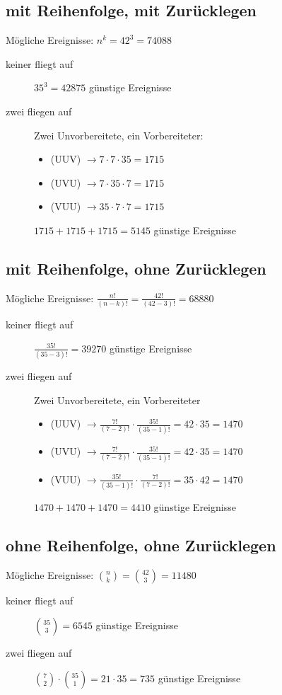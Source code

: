 \documentclass[11pt, a4paper]{article}
\begin{document}
\subsection{mit Reihenfolge, mit Zurücklegen}
Mögliche Ereignisse: $n^k = 42^3 = 74088$
\begin{description}
	\item[keiner fliegt auf] $35^3 = 42875$  günstige Ereignisse
	\item[zwei fliegen auf] Zwei Unvorbereitete, ein Vorbereiteter:
		\begin{itemize}
			\item (UUV) $\rightarrow 7 \cdot 7 \cdot 35 = 1715$
			\item (UVU) $\rightarrow 7 \cdot 35 \cdot 7 = 1715$
			\item (VUU) $\rightarrow 35 \cdot 7 \cdot 7 = 1715$
		\end{itemize}
		$1715 + 1715 + 1715 = 5145$ günstige Ereignisse
\end{description}

\subsection{mit Reihenfolge, ohne Zurücklegen}
Mögliche Ereignisse: $\frac{n!}{(n-k)!} = \frac{42!}{(42-3)!} = 68880$
\begin{description}
	\item[keiner fliegt auf] $\frac{35!}{(35-3)!} = 39270$ günstige Ereignisse
	\item[zwei fliegen auf] Zwei Unvorbereitete, ein Vorbereiteter
		\begin{itemize}
			\item (UUV) $\rightarrow \frac{7!}{(7-2)!} \cdot \frac{35!}{(35-1)!} = 42 \cdot 35 = 1470$
			\item (UVU) $\rightarrow \frac{7!}{(7-2)!} \cdot \frac{35!}{(35-1)!} = 42 \cdot 35 = 1470$
			\item (VUU) $\rightarrow \frac{35!}{(35-1)!} \cdot \frac{7!}{(7-2)!} = 35 \cdot 42 = 1470$
		\end{itemize}
		$1470 + 1470 + 1470 = 4410$ günstige Ereignisse
\end{description}

\subsection{ohne Reihenfolge, ohne Zurücklegen}
Mögliche Ereignisse: $\binom{n}{k} = \binom{42}{3} = 11480$
\begin{description}
	\item[keiner fliegt auf] $\binom{35}{3} = 6545$  günstige Ereignisse
	\item[zwei fliegen auf] $\binom{7}{2} \cdot \binom{35}{1} = 21 \cdot 35 = 735$  günstige Ereignisse
\end{description}
\end{document}
